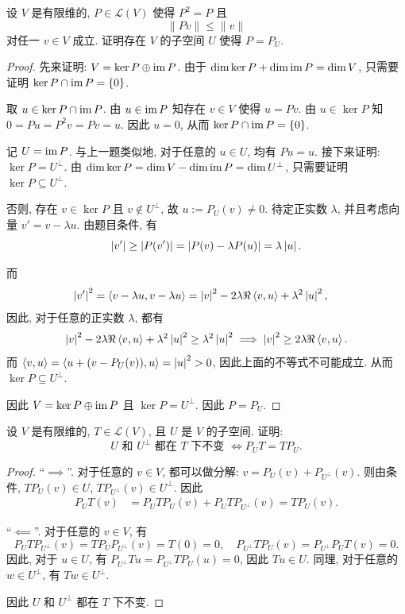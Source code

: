 \documentclass{article}
\begin{document}
\begin{problem}[6C-10]
设 $V$ 是有限维的, $P \in \mathcal{L}(V)$ 使得 $P^2 = P$ 且
\[
\lVert Pv \rVert \le \lVert v \rVert
\]
对任一 $v \in V$ 成立. 证明存在 $V$ 的子空间 $U$ 使得 $P = P_U$.
\end{problem}

\begin{proof}
  先来证明: \( V=\ker P\oplus\operatorname{im} P \). 由于 \( \dim\ker P+\dim\operatorname{im} P=\dim V \), 只需要证明 \( \ker P\cap\operatorname{im} P=\{0\} \). \par
  取 \( u\in\ker P\cap\operatorname{im} P \). 由 \( u\in\operatorname{im} P \) 知存在 \( v\in V \) 使得 \( u=Pv \). 由 \( u\in\ker P \) 知 \( 0=Pu=P^2v=Pv=u \). 因此 \( u=0 \), 从而 \( \ker P\cap\operatorname{im} P=\{0\} \).\par
  记 \( U=\operatorname{im} P \). 与上一题类似地, 对于任意的 \( u\in U \), 均有 \( Pu=u \). 接下来证明: \( \ker P=U^\perp \). 由 \( \dim\ker P=\dim V-\dim\operatorname{im} P=\dim U^\perp \), 只需要证明 \( \ker P\subseteq U^\perp \). \par
  否则, 存在 \( v\in\ker P \) 且 \( v\not\in U^\perp \), 故 \( u:=P_U(v)\neq 0 \). 待定正实数 \( \lambda \), 并且考虑向量 \( v'=v-\lambda u \). 由题目条件, 有 
  \[ \left|v'\right|\ge\left|P(v')\right|=\left|P(v)-\lambda P(u)\right|=\lambda\left|u\right|. \]\par
  而
  \begin{align*}
    \left|v'\right|^2
    &=\left\langle v-\lambda u, v-\lambda u \right\rangle
    =\left|v\right|^2-2\lambda\Re\left\langle v, u \right\rangle+\lambda^2\left|u\right|^2,
  \end{align*}
  因此, 对于任意的正实数 \( \lambda \), 都有
  \[ \left|v\right|^2-2\lambda\Re \left\langle v, u \right\rangle+\lambda^2\left|u\right|^2\ge \lambda^2\left|u\right|^2\implies \left|v\right|^2\ge 2\lambda\Re \left\langle v, u \right\rangle. \]
  而 \( \left\langle v, u \right\rangle=\left\langle u+(v-P_U(v)), u \right\rangle=\left|u\right|^2>0 \), 因此上面的不等式不可能成立. 从而 \( \ker P\subseteq U^\perp \).\par
  因此 \( V=\ker P\oplus\operatorname{im} P \) 且 \( \ker P=U^\perp \). 因此 \( P=P_U \).
\end{proof}



\begin{problem}[6C-12]
设 $V$ 是有限维的, $T \in \mathcal{L}(V)$, 且 $U$ 是 $V$ 的子空间. 证明:
\[
U \text{ 和 } U^{\perp} \text{ 都在 } T \text{ 下不变 } \Longleftrightarrow P_U T = T P_U.
\]
\end{problem}

\begin{proof}
  ``\( \implies \)''. 对于任意的 \( v\in V \), 都可以做分解: \( v=P_U(v)+P_{U^\perp}(v) \). 则由条件, \( TP_U(v)\in U \), \( TP_{U^\perp}(v)\in U^\perp \). 因此
  \begin{align*}
    P_UT(v)
    &=P_UTP_U(v)+P_UTP_{U^\perp}(v)
    =TP_U(v).
  \end{align*}\par
  ``\( \impliedby \)''. 对于任意的 \( v\in V \), 有
  \[ P_UTP_{U^\perp}(v)=TP_UP_{U^\perp}(v)=T(0)=0,\quad
  P_{U^\perp}TP_U(v)=P_{U^\perp}P_UT(v)=0. \]
  因此, 对于 \( u\in U \), 有 \( P_{U^\perp}Tu=P_{U^\perp}TP_U(u)=0 \), 因此 \( Tu\in U \). 同理, 对于任意的 \( w\in U^\perp \), 有 \( Tw\in U^\perp \).\par
  因此 \( U \) 和 \( U^\perp \) 都在 \( T \) 下不变.
\end{proof}
\end{document}
